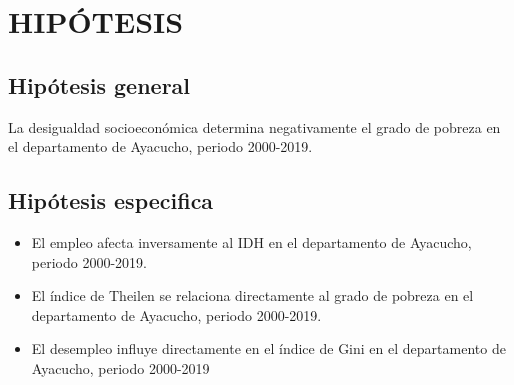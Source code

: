 \section{HIPÓTESIS}

\subsection{Hipótesis general}

La desigualdad socioeconómica determina negativamente el grado de pobreza en el departamento de Ayacucho, periodo 2000-2019.

\subsection{Hipótesis especifica}

\begin{itemize}
\item El empleo afecta inversamente al IDH en el departamento de Ayacucho, periodo 2000-2019.
\item El índice de Theilen se relaciona directamente al grado de pobreza en el departamento de Ayacucho, periodo 2000-2019.
\item El desempleo influye directamente en el índice de Gini en el departamento de Ayacucho, periodo 2000-2019

\end{itemize}






		
